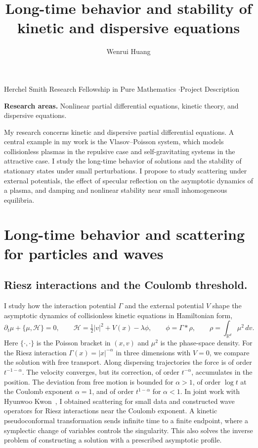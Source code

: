 \documentclass[reqno,10pt,a4paper]{amsart}
\title[Long-time behavior and stability]{Long-time behavior and stability of\\ kinetic and dispersive equations}
\author{Wenrui Huang}
\date{}
\numberwithin{equation}{section}
\newcommand{\R}{\mathbb R}
\begin{document}
\maketitle
\begin{center}
{\small Herchel Smith Research Fellowship in Pure Mathematics \enspace$\cdot$\enspace Project Description}
\end{center}
\smallskip
\noindent\textbf{Research areas.} Nonlinear partial differential equations, kinetic theory, and dispersive equations.
\medskip

My research concerns kinetic and dispersive partial differential equations. A central example in my work is the Vlasov--Poisson system, which models collisionless plasmas in the repulsive case and self-gravitating systems in the attractive case. I study the long-time behavior of solutions and the stability of stationary states under small perturbations. I propose to study scattering under external potentials, the effect of specular reflection on the asymptotic dynamics of a plasma, and damping and nonlinear stability near small inhomogeneous equilibria.

\section{Long-time behavior and scattering for particles and waves}

\subsection*{Riesz interactions and the Coulomb threshold.}
I study how the interaction potential $\Gamma$ and the external potential $V$ shape the asymptotic dynamics of collisionless kinetic equations in Hamiltonian form,
\[
 \partial_t\mu+\{\mu,\mathcal H\}=0,\qquad
 \mathcal H=\tfrac12|v|^2+V(x)-\lambda\phi,\qquad
 \phi=\Gamma*\rho,\qquad \rho=\int_{\R^d}\mu^2\,dv .
\]
Here $\{\cdot,\cdot\}$ is the Poisson bracket in $(x,v)$ and $\mu^2$ is the phase-space density. For the Riesz interaction $\Gamma(x)=|x|^{-\alpha}$ in three dimensions with $V=0$, we compare the solution with free transport. Along dispersing trajectories the force is of order $t^{-1-\alpha}$. The velocity converges, but its correction, of order $t^{-\alpha}$, accumulates in the position. The deviation from free motion is bounded for $\alpha>1$, of order $\log t$ at the Coulomb exponent $\alpha=1$, and of order $t^{1-\alpha}$ for $\alpha<1$. In joint work with Hyunwoo Kwon~\cite{HK24}, I obtained scattering for small data and constructed wave operators for Riesz interactions near the Coulomb exponent. A kinetic pseudoconformal transformation sends infinite time to a finite endpoint, where a symplectic change of variables controls the singularity. This also solves the inverse problem of constructing a solution with a prescribed asymptotic profile.
\end{document}
